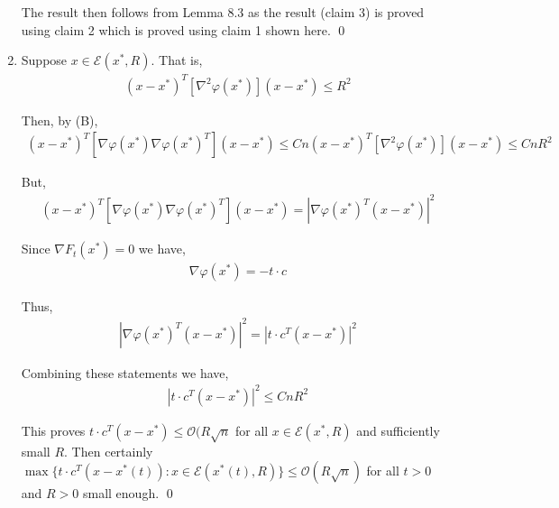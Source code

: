 \documentclass[10pt]{article}
\begin{document}
\begin{solution}
\begin{enumerate}
        The result then follows from Lemma 8.3 as the result (claim 3) is proved using claim 2 which is proved using claim 1 shown here. \qed
\fi
    \item
        Suppose \( x\in \mathcal{E}(x^*,R) \). 
        That is,
        \begin{align*}
            (x-x^*)^T \left[ \nabla^2 \varphi(x^*) \right] (x-x^*) \leq R^2
        \end{align*}
        
        Then, by (B),
        \begin{align*}
            (x-x^*)^T \left[ \nabla \varphi(x^*) \nabla \varphi(x^*)^T \right] (x-x^*) 
            \leq Cn (x-x^*)^T \left[ \nabla^2 \varphi(x^*) \right] (x-x^*) \leq CnR^2
        \end{align*}
        
        But,
        \begin{align*}
            (x-x^*)^T \left[ \nabla \varphi(x^*) \nabla \varphi(x^*)^T \right] (x-x^*) 
            = \left|\nabla \varphi(x^*)^T (x-x^*)\right|^2
        \end{align*}
        
        Since \( \nabla F_t(x^*) = 0 \) we have,
        \begin{align*}
            \nabla \varphi(x^*) = -t\cdot c
        \end{align*}
        
        Thus,
        \begin{align*}
            \left|\nabla \varphi(x^*)^T (x-x^*)\right|^2
            = \left| t\cdot c^T (x-x^*) \right|^2
        \end{align*}
       
        Combining these statements we have,
        \begin{align*}
            \left| t\cdot c^T (x-x^*) \right|^2
            \leq CnR^2
        \end{align*}

        This proves \( t\cdot c^T(x-x^*) \leq \mathcal{O} (R\sqrt{n} \) for all \( x\in \mathcal{E} (x^*,R) \) and sufficiently small \( R \). Then certainly 
\( \max\{t\cdot c^T(x-x^*(t)) : x\in \mathcal{E}(x^*(t),R)\} \leq \mathcal{O} (R\sqrt{n}) \) for all \( t > 0 \) and \( R>0 \) small enough. \qed
\end{enumerate}
\end{solution}
\end{document}
